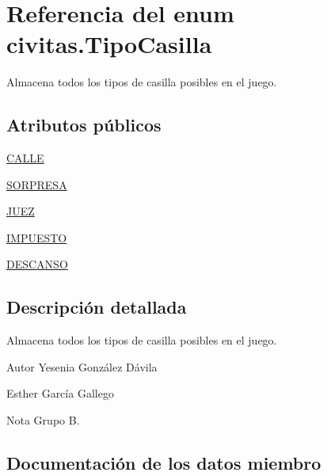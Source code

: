 \hypertarget{enumcivitas_1_1TipoCasilla}{}\section{Referencia del enum civitas.\+Tipo\+Casilla}
\label{enumcivitas_1_1TipoCasilla}


Almacena todos los tipos de casilla posibles en el juego.  


\subsection*{Atributos públicos}
\begin{DoxyCompactItemize}
\item 
\hyperlink{enumcivitas_1_1TipoCasilla_a5469ecab613818701423224edbbe4044}{C\+A\+L\+LE}
\item 
\hyperlink{enumcivitas_1_1TipoCasilla_ada6a89d7718211ca4560389a2b4a0017}{S\+O\+R\+P\+R\+E\+SA}
\item 
\hyperlink{enumcivitas_1_1TipoCasilla_aedb46091e6869f9b0e0c1d30a706261b}{J\+U\+EZ}
\item 
\hyperlink{enumcivitas_1_1TipoCasilla_a56414bfb3cf302238974737f85aea7d3}{I\+M\+P\+U\+E\+S\+TO}
\item 
\hyperlink{enumcivitas_1_1TipoCasilla_af91da3aef94e6a5d6dc9c6cf3b79791d}{D\+E\+S\+C\+A\+N\+SO}
\end{DoxyCompactItemize}


\subsection{Descripción detallada}
Almacena todos los tipos de casilla posibles en el juego. 

\begin{DoxyAuthor}{Autor}
Yesenia González Dávila 

Esther García Gallego 
\end{DoxyAuthor}
\begin{DoxyNote}{Nota}
Grupo B. 
\end{DoxyNote}


\subsection{Documentación de los datos miembro}
\mbox{\label{enumcivitas_1_1TipoCasilla_a5469ecab613818701423224edbbe4044}} 
